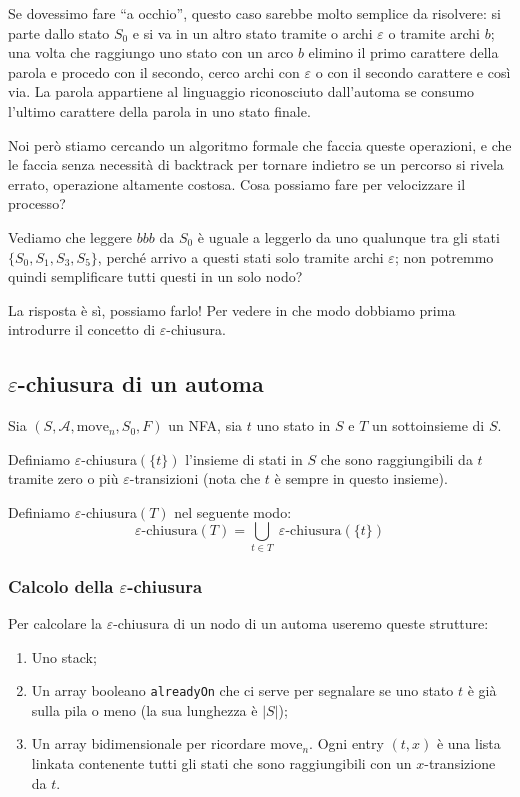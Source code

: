 \documentclass[class=book, crop=false, oneside, 12pt]{standalone}
\begin{document}
Se dovessimo fare “a occhio”, questo caso sarebbe molto semplice da risolvere: si parte dallo stato \(S_0\) e si va in un altro stato tramite o archi \(\varepsilon\) o tramite archi \(b\); una volta che raggiungo uno stato con un arco \(b\) elimino il primo carattere della parola e procedo con il secondo, cerco archi con \(\varepsilon\) o con il secondo carattere e così via.
La parola appartiene al linguaggio riconosciuto dall’automa se consumo l’ultimo carattere della parola in uno stato finale.

Noi però stiamo cercando un algoritmo formale che faccia queste operazioni, e che le faccia senza necessità di backtrack per tornare indietro se un percorso si rivela errato, operazione altamente costosa.
Cosa possiamo fare per velocizzare il processo?

Vediamo che leggere \(bbb\) da \(S_0\) è uguale a leggerlo da uno qualunque tra gli stati \(\{S_0, S_1, S_3, S_5\}\), perché arrivo a questi stati solo tramite archi \(\varepsilon\); non potremmo quindi semplificare tutti questi in un solo nodo?

La risposta è sì, possiamo farlo! Per vedere in che modo dobbiamo prima introdurre il concetto di \(\varepsilon\)-chiusura.


\subsection{\(\varepsilon\)-chiusura di un automa}
Sia \((S, \mathcal{A}, \textrm{move}_n, S_0, F)\) un NFA, sia \(t\) uno stato in \(S\) e \(T\) un sottoinsieme di \(S\).

Definiamo \(\varepsilon\)-chiusura\((\{t\})\) l’insieme di stati in \(S\) che sono raggiungibili da \(t\) tramite zero o più \(\varepsilon\)-transizioni (nota che \(t\) è sempre in questo insieme).

Definiamo \(\varepsilon\)-chiusura\((T)\) nel seguente modo:
\begin{equation}
    \varepsilon \textrm{-chiusura}(T) = \bigcup_{t \in T} \;\varepsilon\textrm{-chiusura}(\{t\})
\end{equation} 

\subsubsection{Calcolo della \(\varepsilon\)-chiusura}
Per calcolare la \(\varepsilon\)-chiusura di un nodo di un automa useremo queste strutture:

\begin{enumerate}
    \item Uno stack;
    \item Un array booleano \texttt{alreadyOn} che ci serve per segnalare se uno stato \(t\) è già sulla pila o meno (la sua lunghezza è \(|S|\));
    \item Un array bidimensionale per ricordare \(\textrm{move}_n\). Ogni entry \((t,x)\) è una lista linkata contenente tutti gli stati che sono raggiungibili con un \(x\)-transizione da \(t\).
\end{enumerate}
\end{document}
